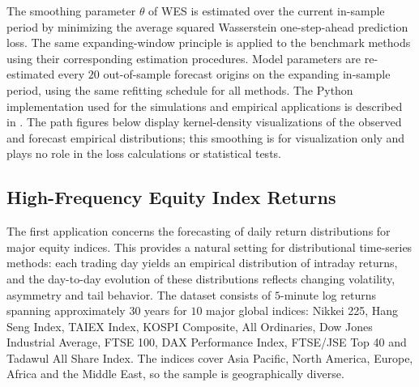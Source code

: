 \documentclass[a4paper, 11pt]{article}
\theoremstyle{definition}
\begin{document}
The smoothing parameter $\theta$ of WES is estimated over the current in-sample period by minimizing the average squared Wasserstein one-step-ahead prediction loss. 
The same expanding-window principle is applied to the benchmark methods using their corresponding estimation procedures. 
Model parameters are re-estimated every $20$ out-of-sample forecast origins on the expanding in-sample period, using the same refitting schedule for all methods.
The Python implementation used for the simulations and empirical applications is described in .
The path figures below display kernel-density visualizations of the observed and forecast empirical distributions; this smoothing is for visualization only and plays no role in the loss calculations or statistical tests.

\subsection{High-Frequency Equity Index Returns} \label{sec:equity}

The first application concerns the forecasting of daily return distributions for major equity indices. 
This provides a natural setting for distributional time-series methods: each trading day yields an empirical distribution of intraday returns, and the day-to-day evolution of these distributions reflects changing volatility, asymmetry and tail behavior.
The dataset consists of $5$-minute log returns spanning approximately $30$ years for $10$ major global indices: Nikkei 225, Hang Seng Index, TAIEX Index, KOSPI Composite, All Ordinaries, Dow Jones Industrial Average, FTSE 100, DAX Performance Index, FTSE/JSE Top 40 and Tadawul All Share Index. 
The indices cover Asia Pacific, North America, Europe, Africa and the Middle East, so the sample is geographically diverse.
\end{document}
